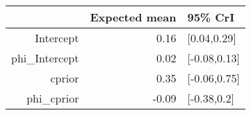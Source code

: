 \begin{tabular}{rrl}
  \hline
 & Expected mean & 95\% CrI \\ 
  \hline
Intercept & 0.16 & [0.04,0.29] \\ 
  phi\_Intercept & 0.02 & [-0.08,0.13] \\ 
  cprior & 0.35 & [-0.06,0.75] \\ 
  phi\_cprior & -0.09 & [-0.38,0.2] \\ 
   \hline
\end{tabular}

